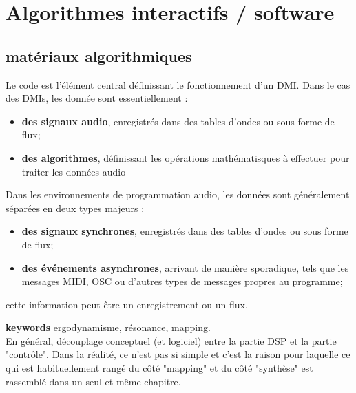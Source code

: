 %
\chapter{Algorithmes interactifs / software}
\label{ch:algorithms}


\section{matériaux algorithmiques}

\noindent Le code est l'élément central définissant le fonctionnement d'un \gls{DMI}. Dans le cas des \glspl{DMI}, les donnée sont essentiellement :
\vspace{-1em}
\begin{itemize}[noitemsep]
	\item \textbf{des signaux audio}, enregistrés dans des tables d'ondes ou sous forme de flux;
	\item \textbf{des algorithmes}, définissant les opérations mathématisques à effectuer pour traiter les données audio
\end{itemize}

Dans les environnements de programmation audio, les données sont généralement séparées en deux types majeurs : 
\begin{itemize}[noitemsep]
	\item \textbf{des signaux synchrones}, enregistrés dans des tables d'ondes ou sous forme de flux;
	\item \textbf{des événements asynchrones}, arrivant de manière sporadique, tels que les messages \gls{MIDI}, \gls{OSC} ou d'autres types de messages propres au programme;
\end{itemize}

 cette information peut être un enregistrement ou un flux.

\textbf{keywords} ergodynamisme, résonance, mapping.\\

En général, découplage conceptuel (et logiciel) entre la partie DSP et la partie "contrôle". Dans la réalité, ce n'est pas si simple et c'est la raison pour laquelle ce qui est habituellement rangé du côté "mapping" et du côté "synthèse" est rassemblé dans un seul et même chapitre.



